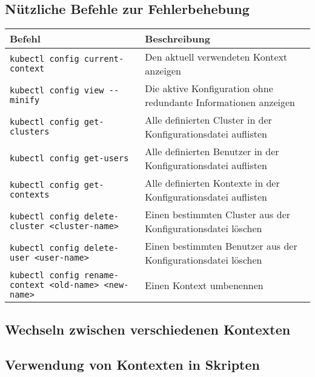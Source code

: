 \subsection{Nützliche Befehle zur Fehlerbehebung}
\begin{tabular}{|p{}|p{}|}
\hline
\textbf{Befehl} & \textbf{Beschreibung} \\
\hline
\texttt{kubectl config current-context} & Den aktuell verwendeten Kontext anzeigen \\
\texttt{kubectl config view {-}{-}minify} & Die aktive Konfiguration ohne redundante Informationen anzeigen \\
\texttt{kubectl config get-clusters} & Alle definierten Cluster in der Konfigurationsdatei auflisten \\
\texttt{kubectl config get-users} & Alle definierten Benutzer in der Konfigurationsdatei auflisten \\
\texttt{kubectl config get-contexts} & Alle definierten Kontexte in der Konfigurationsdatei auflisten \\
\texttt{kubectl config delete-cluster <cluster-name>} & Einen bestimmten Cluster aus der Konfigurationsdatei löschen \\
\texttt{kubectl config delete-user <user-name>} & Einen bestimmten Benutzer aus der Konfigurationsdatei löschen \\
\texttt{kubectl config rename-context <old-name> <new-name>} & Einen Kontext umbenennen \\
\hline
\end{tabular}

\subsection{Wechseln zwischen verschiedenen Kontexten}


\subsection{Verwendung von Kontexten in Skripten}
